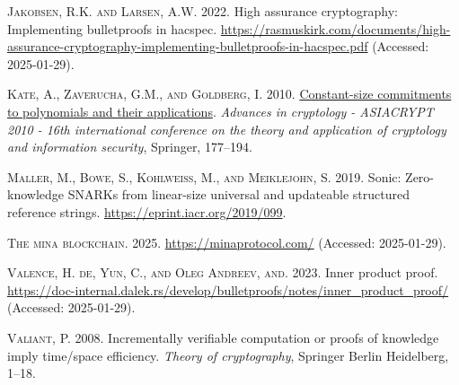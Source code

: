 \documentclass[
]{article}
\newlength{\cslhangindent}
\newenvironment{CSLReferences}[2] %
 {\begin{list}{}{%
  \setlength{\itemindent}{0pt}
  \setlength{\leftmargin}{0pt}
  \setlength{\parsep}{0pt}
  \ifodd #1
   \setlength{\leftmargin}{\cslhangindent}
   \setlength{\itemindent}{-1\cslhangindent}
  \fi
  \setlength{\itemsep}{#2\baselineskip}}}
 {\end{list}}
\begin{document}
\begin{CSLReferences}{1}{1}
\textsc{Jakobsen, R.K. and Larsen, A.W.} 2022. High assurance
cryptography: Implementing bulletproofs in hacspec.
\url{https://rasmuskirk.com/documents/high-assurance-cryptography-implementing-bulletproofs-in-hacspec.pdf}
(Accessed: 2025-01-29).

\textsc{Kate, A., Zaverucha, G.M., and Goldberg, I.} 2010.
\href{https://doi.org/10.1007/978-3-642-17373-8_11}{Constant-size
commitments to polynomials and their applications}. \emph{Advances in
cryptology - ASIACRYPT 2010 - 16th international conference on the
theory and application of cryptology and information security},
Springer, 177--194.

\textsc{Maller, M., Bowe, S., Kohlweiss, M., and Meiklejohn, S.} 2019.
Sonic: Zero-knowledge {SNARKs} from linear-size universal and updateable
structured reference strings. \url{https://eprint.iacr.org/2019/099}.

\textsc{The mina blockchain}. 2025. \url{https://minaprotocol.com/}
(Accessed: 2025-01-29).

\textsc{Valence, H. de, Yun, C., and Oleg Andreev, and}. 2023. Inner
product proof.
\url{https://doc-internal.dalek.rs/develop/bulletproofs/notes/inner_product_proof/}
(Accessed: 2025-01-29).

\textsc{Valiant, P.} 2008. Incrementally verifiable computation or
proofs of knowledge imply time/space efficiency. \emph{Theory of
cryptography}, Springer Berlin Heidelberg, 1--18.

\end{CSLReferences}
\end{document}

